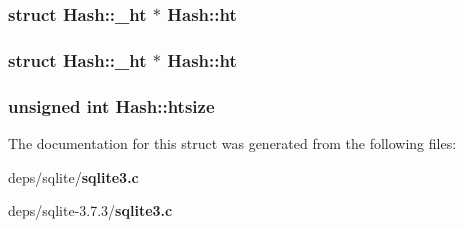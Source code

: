 \subsubsection{\setlength{\rightskip}{0pt plus 5cm}struct \bf{Hash::\_\-ht} $\ast$ \bf{Hash::ht}}\label{structHash_9134ff5a3d15820994806fbefe538840}


\subsubsection{\setlength{\rightskip}{0pt plus 5cm}struct \bf{Hash::\_\-ht} $\ast$ \bf{Hash::ht}}\label{structHash_9134ff5a3d15820994806fbefe538840}


\subsubsection{\setlength{\rightskip}{0pt plus 5cm}unsigned int \bf{Hash::htsize}}\label{structHash_f0da0bb2d8e6a9d3bf91198366f9e1da}




The documentation for this struct was generated from the following files:\begin{CompactItemize}
\item 
deps/sqlite/\bf{sqlite3.c}\item 
deps/sqlite-3.7.3/\bf{sqlite3.c}\end{CompactItemize}

